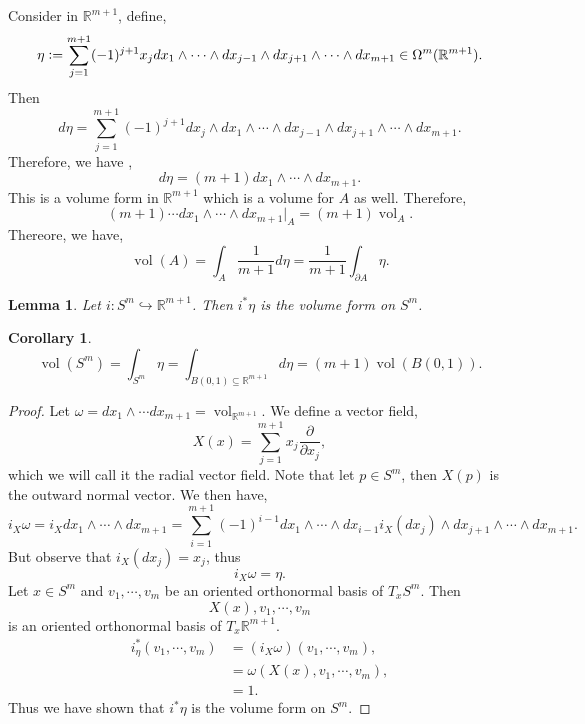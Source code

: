 \documentclass[8pt]{article}
\newtheorem{lemma}{Lemma}[section]
\newtheorem{corollary}{Corollary} [section]
\DeclareMathOperator{\vol}{vol}
\newcommand{\defeq}{\vcentcolon=}
\newcommand{\R}[0]{\mathbb{R}}
\newcommand{\pd}[2]{{\frac {\partial #1} {\partial #2}}}
\begin{document}
Consider in $\R^{m+1}$, define,
\begin{equation*}
\eta\defeq \sum_{j=1}^{m+1}(-1)^{j+1}x_jdx_1\wedge\cdots\wedge dx_{j-1}\wedge dx_{j+1}\wedge\cdots\wedge dx_{m+1}\in\Omega^m(\R^{m+1}).
\end{equation*}
Then 
\begin{equation*}
d\eta = \sum_{j=1}^{m+1}(-1)^{j+1}dx_j\wedge dx_1\wedge\cdots\wedge dx_{j-1}\wedge dx_{j+1}\wedge\cdots\wedge dx_{m+1}.
\end{equation*}
Therefore, we have ,
\begin{equation*}
d\eta = (m+1)dx_1\wedge\cdots\wedge dx_{m+1}.
\end{equation*}
This is a volume form in $\R^{m+1}$ which is a volume for $A$ as well. Therefore,
\begin{equation*}
(m+1)\cdots dx_1\wedge\cdots\wedge dx_{m+1}|_{A} = (m+1)\vol_A.
\end{equation*}
Thereore, we have,
\begin{equation*}
  \vol(A) = \int_A{\frac 1 {m+1}}d\eta = {\frac 1 {m+1}}\int_{\partial A}\eta.
\end{equation*}
\begin{lemma}
  Let $i:S^m\hookrightarrow\R^{m+1}$. Then $i^*\eta$ is the volume form on $S^m$.
\end{lemma}
\begin{corollary}
  \begin{equation*}
  \vol(S^m) = \int_{S^m}\eta = \int_{B(0,1)\subseteq\R^{m+1}}d\eta = (m+1)\vol(B(0,1)).
  \end{equation*}
  \label{corollary_sphere_volume_form}
\end{corollary}
\begin{proof}
  Let $\omega = dx_1\wedge\cdots dx_{m+1} = \vol_{\R^{m+1}}$. We define a vector field,
  \begin{equation*}
    X(x) = \sum_{j=1}^{m+1}x_j\pd{}{x_j},
  \end{equation*}
  which we will call it the radial vector field. Note that let $p\in S^m$, then $X(p)$ is the outward normal vector. We then have,
  \begin{equation*}
    i_X\omega = i_X dx_1\wedge\cdots\wedge dx_{m+1} = \sum_{i=1}^{m+1}(-1)^{i-1}dx_1\wedge\cdots\wedge dx_{i-1} i_X(dx_j)\wedge dx_{j+1}\wedge\cdots \wedge dx_{m+1}.
  \end{equation*}
  But observe that $i_X(dx_j) = x_j$, thus 
  \begin{equation*}
    i_X\omega = \eta.
  \end{equation*}
  Let $x\in S^m$ and $v_1,\cdots,v_m$ be an oriented orthonormal basis of $T_xS^m$. Then 
  \begin{equation*}
    X(x),v_1,\cdots,v_m
  \end{equation*}
  is an oriented orthonormal basis of $T_x\R^{m+1}$. 
  \begin{align*}
    i^*_\eta(v_1,\cdots,v_m) &= (i_X\omega)(v_1,\cdots,v_m),\\
    & = \omega(X(x),v_1,\cdots,v_m),\\
    & = 1.
  \end{align*}
  Thus we have shown that $i^*\eta$ is the volume form on $S^m$.
\end{proof}
\end{document}
